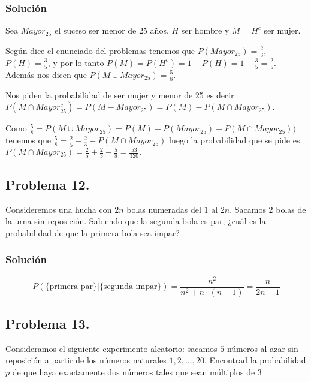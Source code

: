 \documentclass[
]{article}
\begin{document}
\hypertarget{soluciuxf3n-11}{%
\subsubsection{Solución}\label{soluciuxf3n-11}}

Sea \(Mayor_25\) el suceso ser menor de 25 años, \(H\) ser hombre y
\(M=H^c\) ser mujer.

Según dice el enunciado del problemas tenemos que
\(P(Mayor_25)=\frac23\), \(P(H)=\frac35\), y por lo tanto
\(P(M)=P(H^c)=1-P(H)=1-\frac35=\frac25.\) Además nos dicen que
\(P(M\cup Mayor_25)=\frac58.\)

Nos piden la probabilidad de ser mujer y menor de 25 es decir
\(P(M\cap Mayor_25^c)=P(M-Mayor_25)=P(M)-P(M\cap Mayor_25)\).

Como \(\frac58= P(M\cup Mayor_25)=P(M)+ P(Mayor_25)-P(M\cap Mayor_25))\)
tenemos que \(\frac58=\frac25+ \frac23-P(M\cap Mayor_25)\) luego la
probabilidad que se pide es
\(P(M\cap Mayor_25)=\frac25+ \frac23-\frac58=\frac{53}{120}.\)

\hypertarget{problema-12.}{%
\subsection{Problema 12.}\label{problema-12.}}

Consideremos una hucha con \(2n\) bolas numeradas del \(1\) al \(2n\).
Sacamos \(2\) bolas de la urna sin reposición. Sabiendo que la segunda
bola es par, ¿cuál es la probabilidad de que la primera bola sea impar?

\hypertarget{soluciuxf3n-12}{%
\subsubsection{Solución}\label{soluciuxf3n-12}}

\[
P(\mbox{\{primera par\}}|\mbox{\{segunda impar\}})=
\frac{n^2}{n^2+n\cdot (n-1)}=
\frac{n}{2n-1}
\]

\hypertarget{problema-13.}{%
\subsection{Problema 13.}\label{problema-13.}}

Consideramos el siguiente experimento aleatorio: sacamos \(5\) números
al azar sin reposición a partir de los números naturales
\(1,2,\dots,20\). Encontrad la probabilidad \(p\) de que haya
exactamente dos números tales que sean múltiplos de \(3\)
\end{document}

